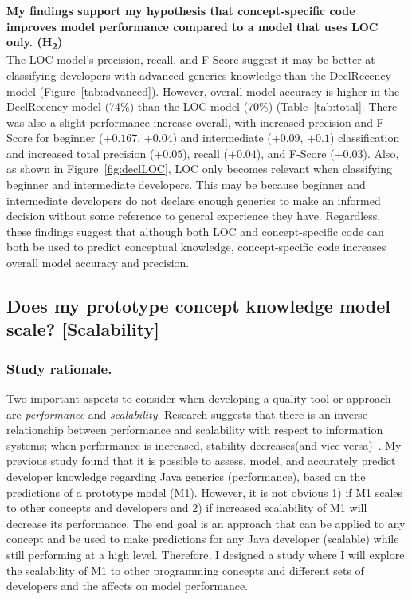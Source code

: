 \documentclass{llncs}
\begin{document}
\vspace{0.5em}

\noindent\textbf{My findings support my hypothesis that concept-specific code improves model performance compared to a model that uses LOC only. (H\textsubscript{2})}\\
The LOC model's precision, recall, and F-Score suggest it may be better at classifying developers with advanced generics knowledge than the DeclRecency model (Figure~\ref{tab:advanced}). However, overall model accuracy is higher in the DeclRecency model (74\%) than the LOC model (70\%) (Table~\ref{tab:total}. There was also a slight performance increase overall, with increased precision and F-Score for beginner (\(+ 0.167\), \(+ 0.04\)) and intermediate (\(+ 0.09\), \(+ 0.1\)) classification and increased total precision (\(+ 0.05\)), recall (\(+ 0.04\)), and F-Score (\(+ 0.03\)). Also, as shown in Figure~\ref{fig:declLOC}, LOC only becomes relevant when classifying beginner and intermediate developers. This may be because beginner and intermediate developers do not declare enough generics to make an informed decision without some reference to general experience they have.
Regardless, these findings suggest that although both LOC and concept-specific code can both be used to predict conceptual knowledge, concept-specific code increases overall model accuracy and precision.


\subsection{Does my prototype concept knowledge model scale? [Scalability]} \label{subsec:s4}

\subsubsection{Study rationale.} Two important aspects to consider when developing a quality tool or approach are \emph{performance} and \emph{scalability}. 
Research suggests that there is an inverse relationship between performance and scalability with respect to information systems; when performance is increased, stability decreases(and vice versa)~\cite{khaddaj2004evaluation}.
My previous study found that it is possible to assess, model, and accurately predict developer knowledge regarding Java generics (performance), based on the predictions of a prototype model (M1). However, it is not obvious 1) if M1 scales to other concepts and developers and 2) if increased scalability of M1 will decrease its performance. 
The end goal is an approach that can be applied to any concept and be used to make predictions for any Java developer (scalable) while still performing at a high level. Therefore, I designed a study where I will explore the scalability of M1 to other programming concepts and different sets of developers and the affects on model performance. 
\end{document}
